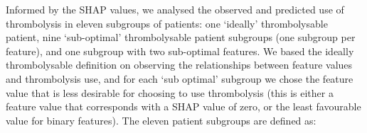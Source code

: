 Informed by the SHAP values, we analysed the observed and predicted use of thrombolysis in eleven subgroups of patients: one `ideally' thrombolysable patient, nine `sub-optimal' thrombolysable patient subgroups (one subgroup per feature), and one subgroup with two sub-optimal features. We based the ideally thrombolysable definition on observing the relationships between feature values and thrombolysis use, and for each `sub optimal' subgroup we chose the feature value that is less desirable for choosing to use thrombolysis (this is either a feature value that corresponds with a SHAP value of zero, or the least favourable value for binary features). The eleven patient subgroups are defined as:


\iffalse
We analysed the observed and predicted use of thrombolysis in subgroups of patients. One `ideally' thrombolysable patient, and nine (one per feature) `sub-optimal' thrombolysable patient groups (selecting patients based on one feature set to a sub-optimal value). We based the ideal definition on observing the relationships between feature values and thrombolysis use, and chose the 'sub-optimal' feature value by choosing a value that's within the contentious range for decision making (a feature value that corresponds with a SHAP value of zero, or the least favourable for binary features). The ten sub-groups are defined as:
\fi

